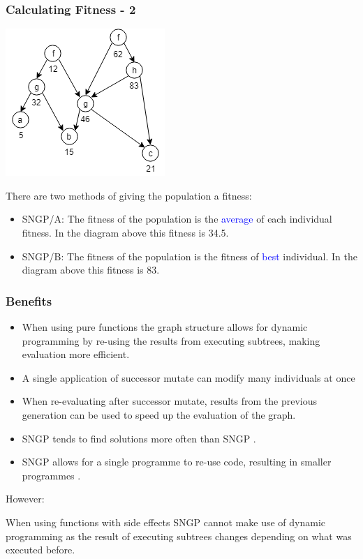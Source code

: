 \documentclass{beamer}
\newcommand{\blue}[1]{\textcolor{blue}{#1}}
\begin{document}
		\begin{frame}
			\frametitle{Calculating Fitness - 2}
			
			\begin{center}
				
				\includegraphics[scale=0.5]{resources/11_sngp_fitness}
				
				
			\end{center}
			
			There are two methods of giving the population a fitness:
			
			\begin{itemize}
				\item SNGP/A: The fitness of the population is the \blue{average} of each individual fitness. In the diagram above this fitness is 34.5.
				\item SNGP/B: The fitness of the population is the fitness of \blue{best} individual. In the diagram above this fitness is 83.
			\end{itemize}
				
	
		\end{frame}
	
		\begin{frame}
		
			\frametitle{Benefits}
					
			\begin{itemize}
				
				\item When using pure functions the graph structure allows for dynamic programming by re-using the results from executing subtrees, making evaluation more efficient.
				\item A single application of successor mutate can modify many individuals at once
				\item When re-evaluating after successor mutate, results from the previous generation can be used to speed up the evaluation of the graph.
				\item SNGP tends to find solutions more often than SNGP \cite{jackson_new_2012, jackson_single_2012}.
				\item SNGP allows for a single programme to re-use code, resulting in smaller programmes \cite{jackson_new_2012}.
				
			\end{itemize}
			
			\pause
			
			However:
			
			When using functions with side effects SNGP cannot make use of dynamic programming as the result of executing subtrees changes depending on what was executed before.

		
		\end{frame}
		
\end{document}
